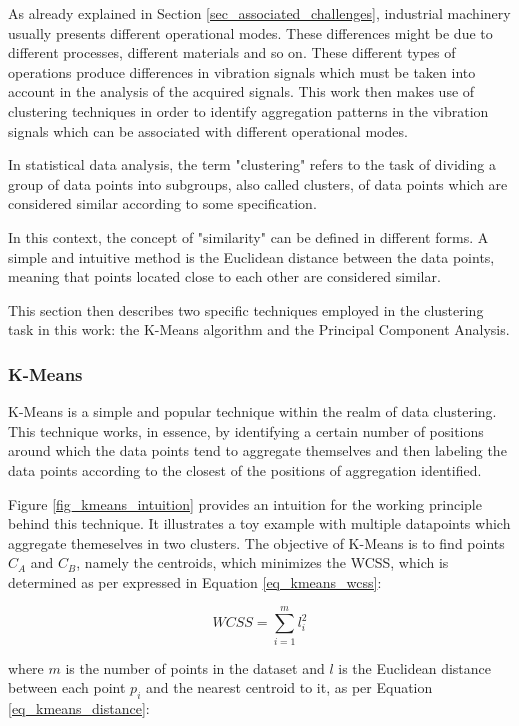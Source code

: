 \documentclass[conference]{IEEEtran}
\begin{document}
As already explained in Section \ref{sec_associated_challenges}, industrial machinery usually presents different operational modes. These differences might be due to different processes, different materials and so on. These different types of operations produce differences in vibration signals which must be taken into account in the analysis of the acquired signals. This work then makes use of clustering techniques in order to identify aggregation patterns in the vibration signals which can be associated with different operational modes.


In statistical data analysis, the term "clustering" refers to the task of dividing a group of data points into subgroups, also called clusters, of data points which are considered similar according to some specification. 

In this context, the concept of "similarity" can be defined in different forms. A simple and intuitive method is the Euclidean distance between the data points, meaning that points located close to each other are considered similar.


This section then describes two specific techniques employed in the clustering task in this work: the K-Means algorithm and the Principal Component Analysis.

\subsubsection{K-Means}

K-Means is a simple and popular technique within the realm of data clustering. This technique works, in essence, by identifying a certain number of positions around which the data points tend to aggregate themselves and then labeling the data points according to the closest of the positions of aggregation identified.

Figure \ref{fig_kmeans_intuition} provides an intuition for the working principle behind this technique. It illustrates a toy example with multiple datapoints which aggregate themeselves in two clusters. The objective of K-Means is to find points $C_{A}$ and $C_{B}$, namely the centroids, which minimizes the WCSS, which is determined as per expressed in Equation \ref{eq_kmeans_wcss}:

\begin{equation}
	\label{eq_kmeans_wcss}
	WCSS=\sum_{i = 1}^{m} l_{i}^{2}
\end{equation}

where $m$ is the number of points in the dataset and $l$ is the Euclidean distance between each point $p_{i}$ and the nearest centroid to it, as per Equation \ref{eq_kmeans_distance}:
\end{document}
